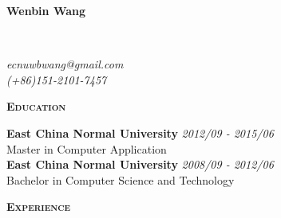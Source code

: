 \documentclass[a4paper]{article}
\newenvironment{changemargin}[2]{%
  \begin{list}{}{%
    \setlength{\topsep}{0pt}%
    \setlength{\leftmargin}{#1}%
    \setlength{\rightmargin}{#2}%
    \setlength{\listparindent}{\parindent}%
    \setlength{\itemindent}{\parindent}%
    \setlength{\parsep}{\parskip}%
  }%
  \item[]}{\end{list}
}
\newcommand{\lineover}{
	\begin{changemargin}{-0.05in}{-0.05in}
		\vspace*{-8pt}
		\hrulefill \\
		\vspace*{-2pt}
	\end{changemargin}
}
\newcommand{\header}[1]{
	\begin{changemargin}{-0.5in}{-0.5in}
		\scshape{\textbf{#1}}\\
	\end{changemargin}
}
\newcommand{\contact}[3]{
	\begin{changemargin}{-0.5in}{-0.5in}
		{\Large \textbf{#1}}\\ \smallskip
		\lineover
		\begin{flushright}
			\emph{#2}\\ \smallskip
			\emph{#3}\smallskip
		\end{flushright}
	\end{changemargin}
}
\newenvironment{body} {
	\vspace*{-16pt}
	\begin{changemargin}{-0.25in}{-0.5in}
  }	
	{\end{changemargin}
}
\begin{document}
\contact{Wenbin Wang}{ecnuwbwang@gmail.com}{(+86)151-2101-7457}

\header{Education}

\begin{body}
	\vspace{14pt}
	\textbf{East China Normal University} \hfill \emph{2012/09 - 2015/06}\\
	 Master in Computer Application\\
	\textbf{East China Normal University} \hfill \emph{2008/09 - 2012/06}\\
	Bachelor in Computer Science and Technology\\
\end{body}

\medskip


\header{Experience}
\end{document}
